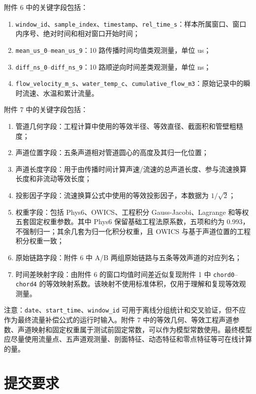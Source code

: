 \documentclass[UTF8,a4paper,11pt]{ctexart}
\begin{document}
附件 6 中的关键字段包括：
\begin{enumerate}
  \item \texttt{window\_id}、\texttt{sample\_index}、\texttt{timestamp}、\texttt{rel\_time\_s}：样本所属窗口、窗口内序号、绝对时间和相对窗口开始时间；
  \item \texttt{mean\_us\_0}--\texttt{mean\_us\_9}：10 路传播时间均值类观测量，单位 us；
  \item \texttt{diff\_ns\_0}--\texttt{diff\_ns\_9}：10 路顺逆向时间差类观测量，单位 ns；
  \item \texttt{flow\_velocity\_m\_s}、\texttt{water\_temp\_c}、\texttt{cumulative\_flow\_m3}：原始记录中的瞬时流速、水温和累计流量。
\end{enumerate}

附件 7 中的关键字段包括：
\begin{enumerate}
  \item 管道几何字段：工程计算中使用的等效半径、等效直径、截面积和管壁粗糙度；
  \item 声道位置字段：五条声道相对管道圆心的高度及其归一化位置；
  \item 声道长度字段：用于由传播时间计算声速/流速的总声道长度、参与流速换算长度和非流动等效长度；
  \item 投影因子字段：流速换算公式中使用的等效投影因子，本数据为 $1/\sqrt{2}$；
  \item 权重字段：包括 Phys6、OWICS、工程积分 Gauss-Jacobi、Lagrange 和等权五套固定权重参数。其中 Phys6 保留基础工程法原系数，五项和约为 0.993，不强制归一；其余几套为归一化积分权重，且 OWICS 与基于声道位置的工程积分权重一致；
  \item 原始链路字段：附件 6 中 A/B 两组原始链路与五条等效声道的对应列名；
  \item 时间差映射字段：由附件 6 的窗口均值时间差近似复现附件 1 中 \texttt{chord0}--\texttt{chord4} 的等效映射系数。该映射不使用标准体积，仅用于理解和复现等效观测量。
\end{enumerate}

注意：\texttt{date}、\texttt{start\_time}、\texttt{window\_id} 可用于离线分组统计和交叉验证，但不应作为最终流量补偿公式的运行时输入。附件 7 中的等效几何、等效工程声道参数、声道映射和固定权重属于测试前固定常数，可以作为模型常数使用。最终模型应尽量使用流量点、五声道观测量、剖面特征、动态特征和零点特征等可在线计算的量。

\section*{提交要求}
\end{document}
